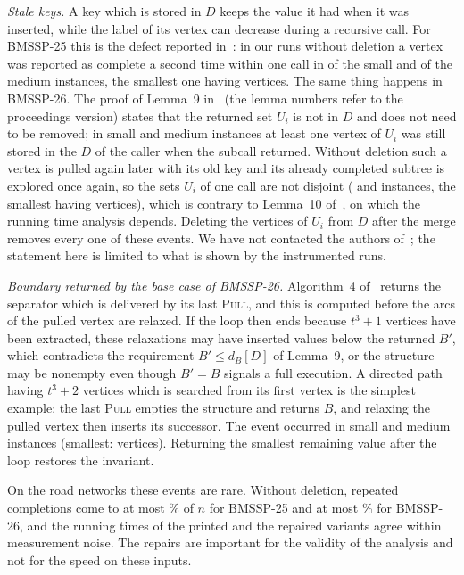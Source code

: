 \documentclass[conference,a4paper]{IEEEtran}
\newcommand{\Bp}{B'}
\newcommand{\bmA}{BMSSP-25}
\newcommand{\bmB}{BMSSP-26}
\begin{document}
\emph{Stale keys.} A key which is stored in $D$ keeps the value it had when it was inserted,
while the label of its vertex can decrease during a recursive call. For \bmA{} this is the defect
reported in~\cite{castro2025}: in our runs without deletion a vertex was reported as complete a
second time within one call in \ValSmallDupTwoFive{} of the small and \ValMediumDupTwoFive{} of
the medium instances, the smallest one having \ValMinNDupTwoFive{} vertices. The same thing
happens in \bmB{}. The proof of Lemma~9 in~\cite{duan2026} (the lemma numbers refer to the
proceedings version) states that the returned set $U_i$ is not in $D$ and does not need to be
removed; in \ValSmallStaleTwoSix{} small and \ValMediumStaleTwoSix{} medium instances at least
one vertex of $U_i$ was still stored in the $D$ of the caller when the subcall returned. Without
deletion such a vertex is pulled again later with its old key and its already completed subtree
is explored once again, so the sets $U_i$ of one call are not disjoint (\ValSmallDupTwoSix{} and
\ValMediumDupTwoSix{} instances, the smallest having \ValMinNDupTwoSix{} vertices), which is
contrary to Lemma~10 of~\cite{duan2026}, on which the running time analysis depends. Deleting
the vertices of $U_i$ from $D$ after the merge removes every one of these events. We have not
contacted the authors of~\cite{duan2026}; the statement here is limited to what is shown by the
instrumented runs.

\emph{Boundary returned by the base case of \bmB.} Algorithm~4 of~\cite{duan2026} returns the
separator which is delivered by its last \textsc{Pull}, and this is computed before the arcs of
the pulled vertex are relaxed. If the loop then ends because $t^3+1$ vertices have been
extracted, these relaxations may have inserted values below the returned $\Bp$, which
contradicts the requirement $\Bp\le d_B[D]$ of Lemma~9, or the structure may be nonempty even
though $\Bp=B$ signals a full execution. A directed path having $t^3+2$ vertices which is
searched from its first vertex is the simplest example: the last \textsc{Pull} empties the
structure and returns $B$, and relaxing the pulled vertex then inserts its successor. The event
occurred in \ValSmallBoundTwoSix{} small and \ValMediumBoundTwoSix{} medium instances (smallest:
\ValMinNBoundTwoSix{} vertices). Returning the smallest remaining value after the loop restores
the invariant.

On the road networks these events are rare. Without deletion, repeated completions come to at
most \DupPctMaxTwoFive\% of $n$ for \bmA{} and at most \DupPctMaxTwoSix\% for \bmB{}, and the
running times of the printed and the repaired variants agree within measurement noise. The
repairs are important for the validity of the analysis and not for the speed on these inputs.
\end{document}
